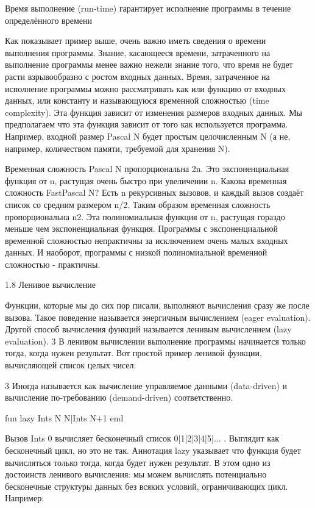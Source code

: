 Время выполнение (run-time) гарантирует исполнение программы в течение определённого времени

Как показывает пример выше, очень важно иметь сведения о времени выполнения программы. Знание, касающееся времени, затраченного на выполнение программы менее важно нежели знание того, что время не будет расти взрывообразно с ростом входных данных. Время, затраченное на исполнение программы можно рассматривать как или функцию от входных данных, или константу и называющуюся временной сложностью (time complexity). Эта функция зависит от изменения размеров входных данных. Мы предполагаем что эта функция зависит от того как используется программа. Например, входной размер {Pascal N} будет простым целочисленным N (а не, например, количеством памяти, требуемой для хранения N).

Временная сложность {Pascal N} пропорциональна 2n. Это экспоненциальная функция от n, растущая очень быстро при увеличении n. Какова временная сложность {FastPascal N}? Есть n рекурсивных вызовов, и каждый вызов создаёт список со средним размером n/2. Таким образом временная сложность пропорциональна n2. Эта полиномиальная функция от n, растущая гораздо меньше чем экспоненциальная функция. Программы с экспоненциальной временной сложностью непрактичны за исключением очень малых входных данных. И наоборот, программы с низкой полиномиальной временной сложностью - практичны.

1.8 Ленивое вычисление

Функции, которые мы до сих пор писали, выполняют вычисления сразу же после вызова. Такое поведение называется энергичным вычислением (eager evaluation). Другой способ вычисления функций называется ленивым вычислением (lazy evaluation). 3 В ленивом вычислении выполнение программы начинается только тогда, когда нужен результат. Вот простой пример ленивой функции, вычисляющей список целых чисел:

3 Иногда называется как вычисление управляемое данными (data-driven) и вычисление по-требованию (demand-driven) соответственно.

fun lazy {Ints N}
N|{Ints N+1}
end

Вызов {Ints 0} вычисляет бесконечный список 0|1|2|3|4|5|... . Выглядит как бесконечный цикл, но это не так. Аннотация lazy указывает что функция будет вычисляться только тогда, когда будет нужен результат. В этом одно из достоинств ленивого вычисления: мы можем вычислять потенциально бесконечные структуры данных без всяких условий, ограничивающих цикл. Например:

